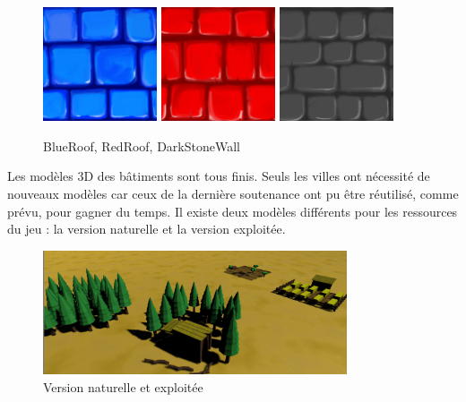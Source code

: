 \documentclass[12pt]{report}
\begin{document}
\begin{figure}[H]
    \centering
    \includegraphics[width=0.3\textwidth]{BlueRoof}
    \includegraphics[width=0.3\textwidth]{RedRoof}
    \includegraphics[width=0.3\textwidth]{DarkStoneWall}
    \caption{BlueRoof, RedRoof, DarkStoneWall}
\end{figure}

Les modèles 3D des bâtiments sont tous finis. Seuls les villes ont nécessité de
nouveaux modèles car ceux de la dernière soutenance ont pu être réutilisé, comme
prévu, pour gagner du temps. Il existe deux modèles différents pour les
ressources du jeu : la version naturelle et la version exploitée.

\begin{figure}[H]
    \centering
    \includegraphics[width=0.8\textwidth]{assets_food_forest}
    \caption{Version naturelle et exploitée}
\end{figure}
\end{document}
